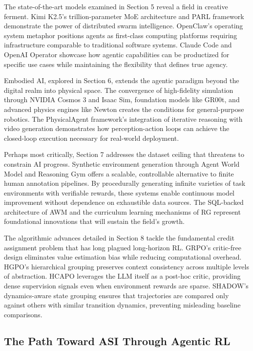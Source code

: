 The state-of-the-art models examined in Section 5 reveal a field in creative ferment. Kimi K2.5's trillion-parameter MoE architecture and PARL framework demonstrate the power of distributed swarm intelligence. OpenClaw's operating system metaphor positions agents as first-class computing platforms requiring infrastructure comparable to traditional software systems. Claude Code and OpenAI Operator showcase how agentic capabilities can be productized for specific use cases while maintaining the flexibility that defines true agency.

Embodied AI, explored in Section 6, extends the agentic paradigm beyond the digital realm into physical space. The convergence of high-fidelity simulation through NVIDIA Cosmos 3 and Isaac Sim, foundation models like GR00t, and advanced physics engines like Newton creates the conditions for general-purpose robotics. The PhysicalAgent framework's integration of iterative reasoning with video generation demonstrates how perception-action loops can achieve the closed-loop execution necessary for real-world deployment.

Perhaps most critically, Section 7 addresses the dataset ceiling that threatens to constrain AI progress. Synthetic environment generation through Agent World Model and Reasoning Gym offers a scalable, controllable alternative to finite human annotation pipelines. By procedurally generating infinite varieties of task environments with verifiable rewards, these systems enable continuous model improvement without dependence on exhaustible data sources. The SQL-backed architecture of AWM and the curriculum learning mechanisms of RG represent foundational innovations that will sustain the field's growth.

The algorithmic advances detailed in Section 8 tackle the fundamental credit assignment problem that has long plagued long-horizon RL. GRPO's critic-free design eliminates value estimation bias while reducing computational overhead. HGPO's hierarchical grouping preserves context consistency across multiple levels of abstraction. HCAPO leverages the LLM itself as a post-hoc critic, providing dense supervision signals even when environment rewards are sparse. SHADOW's dynamics-aware state grouping ensures that trajectories are compared only against others with similar transition dynamics, preventing misleading baseline comparisons.

\subsection{The Path Toward ASI Through Agentic RL}

